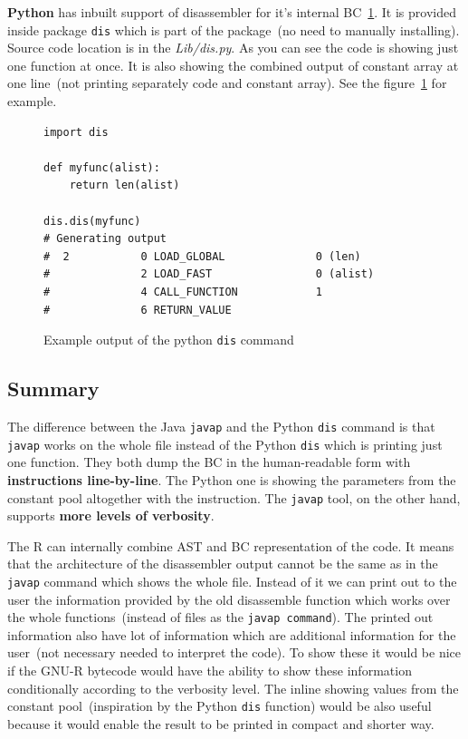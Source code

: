 \documentclass[thesis=M,english]{FITthesis}[2018/10/20]
\newcommand{\code}[1]{\texttt{#1}}
\begin{document}
\textbf{Python} has inbuilt support of disassembler for it's internal BC~\ref{fig:python-dis-output-example}. It is provided inside package \code{dis} which is part of the package~(no need to manually installing). Source code location is in the \textit{Lib/dis.py}. As you can see the code is showing just one function at once. It is also showing the combined output of constant array at one line~(not printing separately code and constant array). See the figure~\ref{fig:python-dis-output-example} for example.

\begin{figure}[!h]
\begin{lstlisting}
import dis

def myfunc(alist):
    return len(alist)

dis.dis(myfunc)
# Generating output
#  2           0 LOAD_GLOBAL              0 (len)
#              2 LOAD_FAST                0 (alist)
#              4 CALL_FUNCTION            1
#              6 RETURN_VALUE

\end{lstlisting}
	\caption{Example output of the python \code{dis} command}\label{fig:python-dis-output-example}
\end{figure}

\subsection{Summary}

The difference between the Java \code{javap} and the Python \code{dis} command is that \code{javap} works on the whole file instead of the Python \code{dis} which is printing just one function. They both dump the BC in the human-readable form with \textbf{instructions line-by-line}. The Python one is showing the parameters from the constant pool altogether with the instruction. The \code{javap} tool, on the other hand, supports \textbf{more levels of verbosity}.

The R can internally combine AST and BC representation of the code. It means that the architecture of the disassembler output cannot be the same as in the \code{javap} command which shows the whole file. Instead of it we can print out to the user the information provided by the old disassemble function which works over the whole functions~(instead of files as the \code{javap command}). The printed out information also have lot of information which are additional information for the user~(not necessary needed to interpret the code). To show these it would be nice if the GNU-R bytecode would have the ability to show these information conditionally according to the verbosity level. The inline showing values from the constant pool~(inspiration by the Python \code{dis} function) would be also useful because it would enable the result to be printed in compact and shorter way.%
\end{document}
